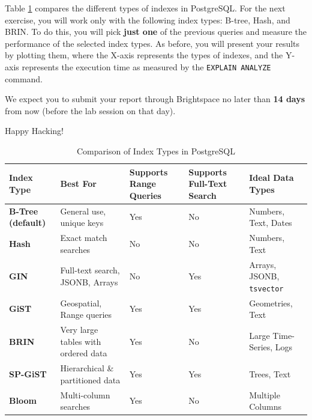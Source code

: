 \documentclass{article}
\begin{document}
Table \ref{tab:postgresql_indexes} compares the different types of indexes in PostgreSQL. For the next exercise, you will work only with the following index types: B-tree, Hash, and BRIN. To do this, you will pick \textbf{just one} of the previous queries and measure the performance of the selected index types. As before, you will present your results by plotting them, where the X-axis represents the types of indexes, and the Y-axis represents the execution time as measured by the \texttt{EXPLAIN ANALYZE} command.

We expect you to submit your report through Brightspace\texttrademark{} no later than \textbf{14 days} from now (before the lab session on that day).

\vspace{5mm}
Happy Hacking! 

\begin{table}
    \centering
    \renewcommand{\arraystretch}{1.3}
    \begin{tabular}{p{1.75cm} p{4cm} p{2cm} p{2cm} p{4cm}}
		\toprule
        \textbf{Index Type} & \textbf{Best For} & \textbf{Supports Range Queries} & \textbf{Supports Full-Text Search} & \textbf{Ideal Data Types} \\
        \midrule
        \textbf{B-Tree (default)} & General use, unique keys & Yes & No & Numbers, Text, Dates \\
        \textbf{Hash} & Exact match searches & No & No & Numbers, Text \\
        \textbf{GIN} & Full-text search, JSONB, Arrays & No & Yes & Arrays, JSONB, \texttt{tsvector} \\
        \textbf{GiST} & Geospatial, Range queries & Yes & Yes & Geometries, Text \\
        \textbf{BRIN} & Very large tables with ordered data & Yes & No & Large Time-Series, Logs \\
        \textbf{SP-GiST} & Hierarchical \& partitioned data & Yes & Yes & Trees, Text \\
        \textbf{Bloom} & Multi-column searches & Yes & No & Multiple Columns \\
        \bottomrule
    \end{tabular}
    \caption{Comparison of Index Types in PostgreSQL}
    \label{tab:postgresql_indexes}
\end{table}
\end{document}
